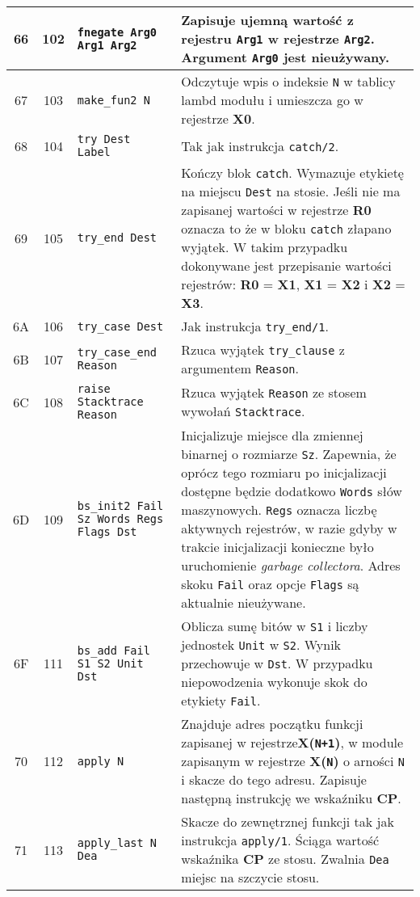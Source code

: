 \begin{longtable}{|c|c|p{5cm}|p{7cm}|}
\hline
66 & 102 & \texttt{fnegate Arg0 Arg1 Arg2} & Zapisuje ujemną wartość z rejestru \texttt{Arg1} w rejestrze \texttt{Arg2}. Argument \texttt{Arg0} jest nieużywany.\\
\hline
67 & 103 & \texttt{make\_fun2 N} & Odczytuje wpis o indeksie \texttt{N} w tablicy lambd modułu i umieszcza go w rejestrze \textbf{X0}. \\
\hline
68 & 104 & \texttt{try Dest Label} & Tak jak instrukcja \texttt{catch/2}.  \\
\hline
69 & 105 & \texttt{try\_end Dest} & Kończy blok \texttt{catch}. Wymazuje etykietę na miejscu \texttt{Dest} na stosie. Jeśli nie ma zapisanej wartości w rejestrze \textbf{R0} oznacza to że w bloku \texttt{catch} złapano wyjątek. W takim przypadku dokonywane jest przepisanie wartości rejestrów: \textbf{R0} = \textbf{X1}, \textbf{X1} = \textbf{X2} i \textbf{X2} = \textbf{X3}.\\
\hline
6A & 106 & \texttt{try\_case Dest} & Jak instrukcja \texttt{try\_end/1}. \\
\hline
6B & 107 & \texttt{try\_case\_end Reason} &  Rzuca wyjątek \texttt{try\_clause} z argumentem \texttt{Reason}.\\
\hline
6C & 108 & \texttt{raise Stacktrace Reason} & Rzuca wyjątek \texttt{Reason} ze stosem wywołań \texttt{Stacktrace}.\\
\hline
6D & 109 & \texttt{bs\_init2 Fail Sz Words Regs Flags Dst} & Inicjalizuje miejsce dla zmiennej binarnej o rozmiarze \texttt{Sz}. Zapewnia, że oprócz tego rozmiaru po inicjalizacji dostępne będzie dodatkowo \texttt{Words} słów maszynowych. \texttt{Regs} oznacza liczbę aktywnych rejestrów, w razie gdyby w trakcie inicjalizacji konieczne było uruchomienie \emph{garbage collectora}. Adres skoku \texttt{Fail} oraz opcje \texttt{Flags} są aktualnie nieużywane. \\
\hline
6F & 111 & \texttt{bs\_add Fail S1 S2 Unit Dst} & Oblicza sumę bitów w \texttt{S1} i liczby jednostek \texttt{Unit} w \texttt{S2}. Wynik przechowuje w \texttt{Dst}. W przypadku niepowodzenia wykonuje skok do etykiety \texttt{Fail}. \\
\hline
70 & 112 & \texttt{apply N} & Znajduje adres początku funkcji zapisanej w rejestrze\textbf{X(\texttt{N+1})}, w module zapisanym w rejestrze \textbf{X(\texttt{N})} o arności \texttt{N} i skacze do tego adresu. Zapisuje następną instrukcję we wskaźniku \textbf{CP}.\\
\hline 
71 & 113 & \texttt{apply\_last N Dea} & Skacze do zewnętrznej funkcji tak jak instrukcja \texttt{apply/1}. Ściąga wartość wskaźnika \textbf{CP} ze stosu. Zwalnia \texttt{Dea} miejsc na szczycie stosu.\\

\end{longtable}
